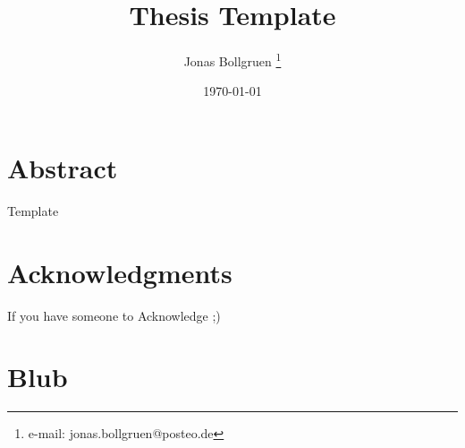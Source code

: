 \documentclass[a4paper,cleardoubleempty,BCOR1cm]{scrbook}
\title{Thesis Template}
\author{Jonas Bollgruen \thanks{e-mail: jonas.bollgruen@posteo.de}}
\date{\today}
\begin{document}


\chapter*{Abstract}
Template

\chapter*{Acknowledgments}
If you have someone to Acknowledge ;)

\tableofcontents




\appendix
\chapter{Blub}



\end{document}
